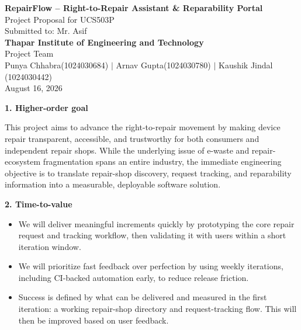 \documentclass[11pt]{article}
\newcommand{\sechead}[2]{%
  \vspace{0.35cm}\noindent
  {\large\bfseries #1}\hfill{\large\itshape #2}\par
  \vspace{0.15cm}
}
\begin{document}
\begin{center}
{\LARGE\bfseries RepairFlow -- Right-to-Repair Assistant \& Reparability Portal}\\[6pt]
Project Proposal for UCS503P\\
Submitted to: Mr. Asif\\
\textbf{Thapar Institute of Engineering and Technology}\\[10pt]
Project Team\\
Punya Chhabra(1024030684) $\vert$ Arnav Gupta(1024030780) $\vert$ Kaushik Jindal (1024030442)\\[10pt]
August 16, 2026
\end{center}

\vspace{0.4cm}

\sechead{1. Higher-order goal}{}
This project aims to advance the right-to-repair movement by making device repair transparent, accessible, and trustworthy for both consumers and independent repair shops. While the underlying issue of e-waste and repair-ecosystem fragmentation spans an entire industry, the immediate engineering objective is to translate repair-shop discovery, request tracking, and reparability information into a measurable, deployable software solution.

\sechead{2. Time-to-value}{}
\begin{itemize}
  \item We will deliver meaningful increments quickly by prototyping the core repair request and tracking workflow, then validating it with users within a short iteration window.
  \item We will prioritize fast feedback over perfection by using weekly iterations, including CI-backed automation early, to reduce release friction.
  \item Success is defined by what can be delivered and measured in the first iteration: a working repair-shop directory and request-tracking flow. This will then be improved based on user feedback.
\end{itemize}
\end{document}
